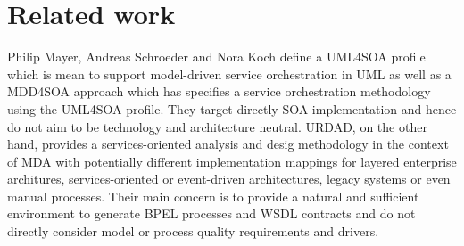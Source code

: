 \section{Related work}
\label{sec:relatedWork}

\cite{chitforoush_methodology_2007}

Philip Mayer, Andreas Schroeder and Nora Koch\cite{mayer_mdd4soa:_2008} define a UML4SOA profile which is mean to support model-driven service orchestration in UML as well as a MDD4SOA approach which has specifies a service orchestration methodology using the UML4SOA profile. They target directly SOA implementation and hence do not aim to be technology and architecture neutral. URDAD, on the other hand, provides a services-oriented analysis and desig methodology in the context of MDA with potentially different implementation mappings for layered enterprise architures, services-oriented or event-driven architectures, legacy systems or even manual processes. Their main concern is to provide a natural and sufficient environment to generate BPEL processes and WSDL contracts and do not directly consider model or process quality requirements and drivers.



\cite{moosavi_method_2009}

\cite{cardei_model_2008}

\cite{shim_design_2008}

